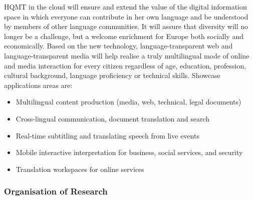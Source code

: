 \documentclass[10pt, plain]{../../metanetpaper}
\begin{document}
\begin{multicols}{2}
%
%

HQMT in the cloud will ensure and extend the value of the digital information space in which everyone can contribute in her own language and be understood by members of other language communities. It will assure that diversity will no longer be a challenge, but a welcome enrichment for Europe both socially and economically. Based on the new technology, language-transparent web and language-transparent media will help realise a truly multilingual mode of online and media interaction for every citizen regardless of age, education, profession, cultural background, language proficiency or technical skills. Showcase applications areas are:

\begin{itemize}
\item Multilingual content production (media, web, technical, legal documents)
\item Cross-lingual communication, document translation and search
\item Real-time subtitling and translating speech from live events
\item Mobile interactive interpretation for business, social services, and security
\item Translation workspaces for online services
\end{itemize}

\subsubsection{Organisation of Research}
\label{sec:organ-rese-pt1}


\end{multicols}
\end{document}
